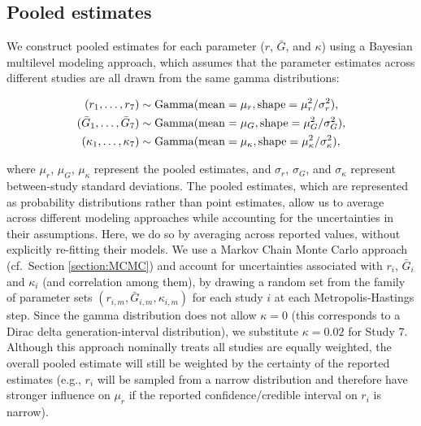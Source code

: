 \documentclass[12pt]{article}
\begin{document}
\subsection{Pooled estimates}

We construct pooled estimates for each parameter ($r$, $\bar G$, and $\kappa$) using a Bayesian multilevel modeling approach, which assumes that the parameter estimates across different studies are all drawn from the same gamma distributions:
\begin{linenomath*}
\begin{equation}
\begin{aligned}
(r_1, \dots, r_7) &\sim \mathrm{Gamma}(\mathrm{mean}=\mu_r, \mathrm{shape}=\mu_r^2/\sigma_r^2),\\
(\bar{G}_1, \dots, \bar{G}_7) &\sim \mathrm{Gamma}(\mathrm{mean}=\mu_G, \mathrm{shape}=\mu_G^2/\sigma_G^2),\\
(\kappa_1, \dots, \kappa_7) &\sim \mathrm{Gamma}(\mathrm{mean}=\mu_\kappa, \mathrm{shape}=\mu_\kappa^2/\sigma_\kappa^2),\\
\end{aligned}
\end{equation}
\end{linenomath*}
where $\mu_r$, $\mu_G$, $\mu_\kappa$ represent the pooled estimates, and $\sigma_r$, $\sigma_G$, and $\sigma_\kappa$ represent between-study standard deviations.
The pooled estimates, which are represented as probability distributions rather than point estimates, allow us to average across different modeling approaches while accounting for the uncertainties in their assumptions.
Here, we do so by averaging across reported values, without explicitly re-fitting their models.
We use a Markov Chain Monte Carlo approach (cf.~Section \ref{section:MCMC}) and account for uncertainties associated with $r_i$, $\bar G_i$ and $\kappa_i$ (and correlation among them), by drawing a random set from the family of parameter sets $(r_{i,m}, \bar{G}_{i,m}, \kappa_{i,m})$ for each study $i$ at each Metropolis-Hastings step.
Since the gamma distribution does not allow $\kappa=0$ (this corresponds to a Dirac delta generation-interval distribution), we substitute $\kappa=0.02$ for Study 7.
Although this approach nominally treats all studies are equally weighted, the overall pooled estimate will still be weighted by the certainty of the reported estimates (e.g., $r_i$ will be sampled from a narrow distribution and therefore have stronger influence on $\mu_r$ if the reported confidence/credible interval on $r_i$ is narrow).
\end{document}
